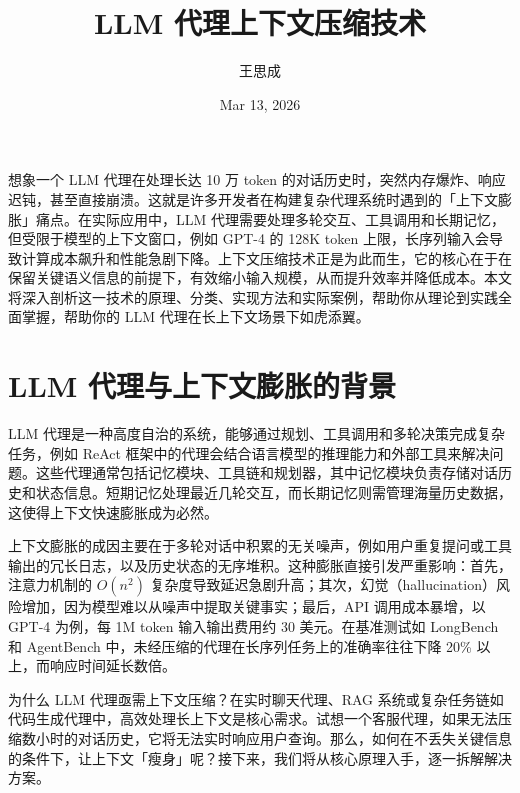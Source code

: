 \title{LLM 代理上下文压缩技术}
\author{王思成}
\date{Mar 13, 2026}
\maketitle
想象一个 LLM 代理在处理长达 10 万 token 的对话历史时，突然内存爆炸、响应迟钝，甚至直接崩溃。这就是许多开发者在构建复杂代理系统时遇到的「上下文膨胀」痛点。在实际应用中，LLM 代理需要处理多轮交互、工具调用和长期记忆，但受限于模型的上下文窗口，例如 GPT-4 的 128K token 上限，长序列输入会导致计算成本飙升和性能急剧下降。上下文压缩技术正是为此而生，它的核心在于在保留关键语义信息的前提下，有效缩小输入规模，从而提升效率并降低成本。本文将深入剖析这一技术的原理、分类、实现方法和实际案例，帮助你从理论到实践全面掌握，帮助你的 LLM 代理在长上下文场景下如虎添翼。\par
\chapter{LLM 代理与上下文膨胀的背景}
LLM 代理是一种高度自治的系统，能够通过规划、工具调用和多轮决策完成复杂任务，例如 ReAct 框架中的代理会结合语言模型的推理能力和外部工具来解决问题。这些代理通常包括记忆模块、工具链和规划器，其中记忆模块负责存储对话历史和状态信息。短期记忆处理最近几轮交互，而长期记忆则需管理海量历史数据，这使得上下文快速膨胀成为必然。\par
上下文膨胀的成因主要在于多轮对话中积累的无关噪声，例如用户重复提问或工具输出的冗长日志，以及历史状态的无序堆积。这种膨胀直接引发严重影响：首先，注意力机制的 $O(n^2)$ 复杂度导致延迟急剧升高；其次，幻觉（hallucination）风险增加，因为模型难以从噪声中提取关键事实；最后，API 调用成本暴增，以 GPT-4 为例，每 1M token 输入输出费用约 30 美元。在基准测试如 LongBench 和 AgentBench 中，未经压缩的代理在长序列任务上的准确率往往下降 20\%{} 以上，而响应时间延长数倍。\par
为什么 LLM 代理亟需上下文压缩？在实时聊天代理、RAG 系统或复杂任务链如代码生成代理中，高效处理长上下文是核心需求。试想一个客服代理，如果无法压缩数小时的对话历史，它将无法实时响应用户查询。那么，如何在不丢失关键信息的条件下，让上下文「瘦身」呢？接下来，我们将从核心原理入手，逐一拆解解决方案。\par
